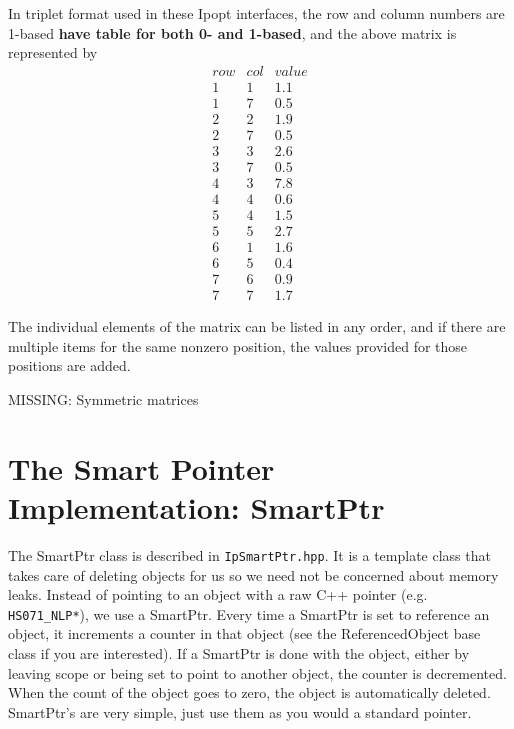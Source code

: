 \documentclass[letter,10pt]{article}
\begin{document}
{In triplet format used in these Ipopt interfaces, the row and column
numbers are 1-based {\bf have table for both 0- and 1-based}, and the
above matrix is represented by
\[
\begin{array}{ccc}
row     &       col     &       value \\
1       &       1       &       1.1     \\
1       &       7       &       0.5     \\
2       &       2       &       1.9     \\
2       &       7       &       0.5     \\
3       &       3       &       2.6     \\
3       &       7       &       0.5     \\
4       &       3       &       7.8     \\
4       &       4       &       0.6     \\
5       &       4       &       1.5     \\
5       &       5       &       2.7     \\
6       &       1       &       1.6     \\
6       &       5       &       0.4     \\
7       &       6       &       0.9     \\
7       &       7       &       1.7
\end{array}
\]

The individual elements of the matrix can be listed in any order, and
if there are multiple items for the same nonzero position, the values
provided for those positions are added.

MISSING: Symmetric matrices


\section{The Smart Pointer Implementation: SmartPtr}

The SmartPtr class is described in {\tt IpSmartPtr.hpp}. It is a
template class that takes care of deleting objects for us so we need
not be concerned about memory leaks. Instead of pointing to an object
with a raw C++ pointer (e.g. {\tt HS071\_NLP*}), we use a SmartPtr.
Every time a SmartPtr is set to reference an object, it increments a
counter in that object (see the ReferencedObject base class if you are
interested). If a SmartPtr is done with the object, either by leaving
scope or being set to point to another object, the counter is
decremented. When the count of the object goes to zero, the object is
automatically deleted. SmartPtr's are very simple, just use them as
you would a standard pointer.

}
\end{document}
